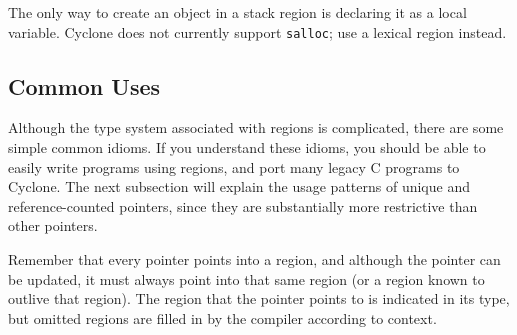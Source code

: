 The only way to create an object in a stack region is declaring it as
a local variable.  Cyclone does not currently support \texttt{salloc};
use a lexical region instead.

\subsection{Common Uses}
\label{sec:common-use}

Although the type system associated with regions is complicated, there are
some simple common idioms.  If you understand these idioms, you should be
able to easily write programs using regions, and port many legacy C programs
to Cyclone.  The next subsection will explain the usage patterns of unique
and reference-counted pointers, since they are substantially more
restrictive than other pointers.

Remember that every pointer points into a region, and although the
pointer can be updated, it must always point into that same region (or
a region known to outlive that region).  The region that the pointer
points to is indicated in its type, but omitted regions are filled in
by the compiler according to context.



